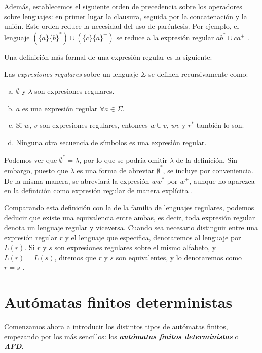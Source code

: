 Además, establecemos el siguiente orden de precedencia sobre los operadores sobre lenguajes: en primer lugar la
clausura, seguida por la concatenación y la unión. Este orden reduce la necesidad del uso de paréntesis. Por ejemplo,
el lenguaje $(\{a\}\{b\}^*)\cup(\{c\}\{a\}^+)$ se reduce a la expresión regular $ab^*\cup ca^+$ \cite{kelley_2001}.

\vspace{10pt}
Una definición más formal de una expresión regular es la siguiente:

\begin{definicion} Las \textit{expresiones regulares} sobre un lenguaje $\Sigma$ se definen 
recursivamente como:
\begin{enumerate}[(a)]
    \item $\emptyset$ y $\lambda$ son expresiones regulares.
    \item $a$ es una expresión regular $\forall a\in\Sigma$.
    \item Si $w$, $v$ son expresiones regulares, entonces $w\cup v$, $wv$ y $r^*$ también lo son.
    \item Ninguna otra secuencia de símbolos es una expresión regular.
\end{enumerate}
Podemos ver que $\emptyset^*=\lambda$, por lo que se podría omitir $\lambda$ de la definición. Sin embargo, puesto que
$\lambda$ es una forma de abreviar $\emptyset^*$, se incluye por conveniencia. De la misma manera, se abreviará la 
expresión $ww^*$ por $w^+$, aunque no aparezca en la definición como expresión regular de manera explícita
\cite{kelley_2001}.
\end{definicion}

Comparando esta definición con la de la familia de lenguajes regulares, podemos deducir que existe una equivalencia
entre ambas, es decir, toda expresión regular denota un lenguaje regular y viceversa. Cuando sea necesario distinguir
entre una expresión regular $r$ y el lenguaje que especifica, denotaremos al lenguaje por $L(r)$. Si $r$ y $s$ son
expresiones regulares sobre el mismo alfabeto, y $L(r)=L(s)$, diremos que $r$ y $s$ son equivalentes, y lo denotaremos
como $r=s$ \cite{kelley_2001}.

\section{Autómatas finitos deterministas}

Comenzamos ahora a introducir los distintos tipos de autómatas finitos, empezando por los más sencillos: los
\textbf{\textit{autómatas finitos deterministas}} o \textbf{\textit{AFD}}.

